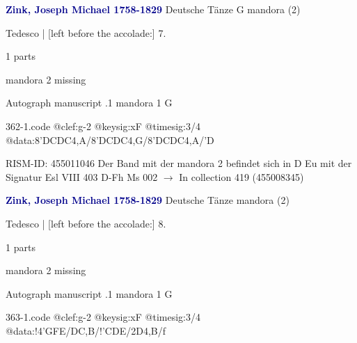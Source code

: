 \documentclass[twocolumn]{book}
\begin{document}
\newline \par \vspace{7pt} \textcolor{darkblue}{\textbf{Zink, Joseph Michael  1758-1829}}
\newline Deutsche Tänze  G  
\newline mandora (2)
\newline \begin{itshape}[f.8v, at left:] Tedesco | [left before the accolade:] 7.\end{itshape} 
\newline \textcolor{darkblue}{}  1 parts  
\newline \begin{small} mandora 2 missing\end{small} 
\newline Autograph manuscript
.1  mandora 1  G  
\begin{filecontents*}{362-1.code}
@clef:g-2
@keysig:xF
@timesig:3/4
@data:8'DCDC4,A/8'DCDC4,G/8'DCDC4,A/'D
\end{filecontents*}
\newline
%

\newline RISM-ID: 455011046
\newline Der Band mit der mandora 2 befindet sich in D Eu mit der Signatur Esl VIII 403
\newline D-Fh  Ms 002
\newline $\rightarrow$ In collection 419 (455008345)

\newline \par \vspace{7pt} \textcolor{darkblue}{\textbf{Zink, Joseph Michael  1758-1829}}
\newline Deutsche Tänze    
\newline mandora (2)
\newline \begin{itshape}[f.9v, at left:] Tedesco | [left before the accolade:] 8.\end{itshape} 
\newline \textcolor{darkblue}{}  1 parts  
\newline \begin{small} mandora 2 missing\end{small} 
\newline Autograph manuscript
.1  mandora 1  G  
\begin{filecontents*}{363-1.code}
@clef:g-2
@keysig:xF
@timesig:3/4
@data:!4'GFE/DC,B/!'CDE/2D4,B/f
\end{filecontents*}
\newline
%
\end{document}
